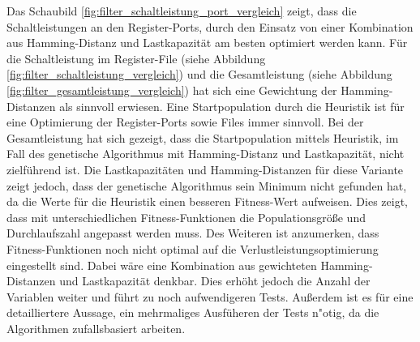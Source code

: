 Das Schaubild \ref{fig:filter_schaltleistung_port_vergleich} zeigt, dass die Schaltleistungen an den Register-Ports, durch den Einsatz von einer Kombination aus Hamming-Distanz und Lastkapazit\"at am besten optimiert werden kann. F\"ur die Schaltleistung im Register-File (siehe Abbildung \ref{fig:filter_schaltleistung_vergleich}) und die Gesamtleistung (siehe Abbildung \ref{fig:filter_gesamtleistung_vergleich}) hat sich eine Gewichtung der Hamming-Distanzen als sinnvoll erwiesen. Eine Startpopulation durch die Heuristik ist f\"ur eine Optimierung der Register-Ports sowie Files immer sinnvoll. Bei der Gesamtleistung hat sich gezeigt, dass die Startpopulation mittels Heuristik, im Fall des genetische Algorithmus mit Hamming-Distanz und Lastkapazit\"at, nicht zielf\"uhrend ist. Die Lastkapazit\"aten und Hamming-Distanzen f\"ur diese Variante zeigt jedoch, dass der genetische Algorithmus sein Minimum nicht gefunden hat, da die Werte f\"ur die Heuristik einen besseren Fitness-Wert aufweisen. Dies zeigt, dass mit unterschiedlichen Fitness-Funktionen die Populationsgr\"o\ss{}e und Durchlaufszahl angepasst werden muss. Des Weiteren ist anzumerken, dass Fitness-Funktionen noch nicht optimal auf die Verlustleistungsoptimierung eingestellt sind. Dabei w\"are eine Kombination aus gewichteten Hamming-Distanzen und Lastkapazit\"at denkbar. Dies erh\"oht jedoch die Anzahl der Variablen weiter und f\"uhrt zu noch aufwendigeren Tests. Au\ss{}erdem ist es f\"ur eine detailliertere Aussage, ein mehrmaliges Ausf\"uheren der Tests n"otig, da die Algorithmen zufallsbasiert arbeiten. 




 


